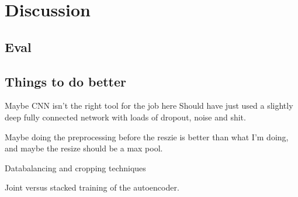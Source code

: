 \chapter{Discussion}
\section{Eval}
\section{Things to do better}


Maybe CNN isn't the right tool for the job here
Should have just used a slightly deep fully connected network
with loads of dropout, noise and shit.

Maybe doing the preprocessing before the reszie is better than what I'm doing,
and maybe the resize should be a max pool.

Databalancing and cropping techniques

Joint versus stacked training of the autoencoder.
